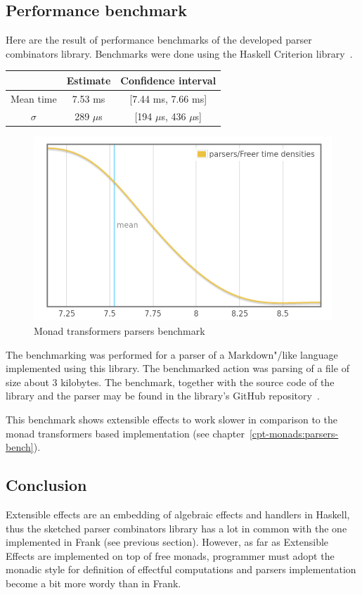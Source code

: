       \subsection{Performance benchmark}

      Here are the result of performance benchmarks of the developed parser
      combinators library. Benchmarks were done using the Haskell Criterion
      library~\cite{criterion}.

      \begin{tabular}{|| c c c||}
        \hline
                      & Estimate & Confidence interval\\
        \hline\hline
        Mean time     & 7.53 ms  & [7.44 ms, 7.66 ms] \\
        $\sigma$      & 289 $\mu$s   & [194 $\mu$s, 436 $\mu$s] \\
        \hline
      \end{tabular}

      \begin{figure}[h]
      \includegraphics[scale=0.4]{images/freer.png}
      \caption{Monad transformers parsers benchmark}
      \label{mtlParserBench}
      \end{figure}

      The benchmarking was performed for a parser of a Markdown"/like language
      implemented using this library. The benchmarked action was parsing of a
      file of size about 3 kilobytes. The benchmark, together with the source code
      of the library and the parser may be found in the library's GitHub
      repository~\cite{extEffParsers}.

      This benchmark shows extensible effects to work slower in comparison to the monad transformers based implementation (see chapter~\ref{cpt-monads:parsers-bench}).

      \subsection{Conclusion}

      Extensible effects are an embedding of algebraic effects and handlers in Haskell,
      thus the sketched parser combinators library has a lot in common with the one
      implemented in Frank (see previous section). However, as far as Extensible
      Effects are implemented on top of free monads, programmer must adopt the monadic
      style for definition of effectful computations and parsers implementation
      become a bit more wordy than in Frank.
